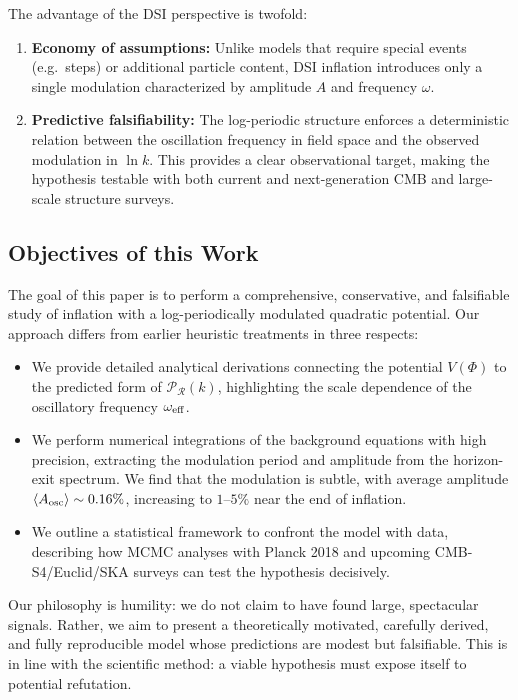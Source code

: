 \documentclass[reprint, amsmath, amssymb, aps, prd, nofootinbib]{revtex4-2}
\begin{document}
The advantage of the DSI perspective is twofold:
\begin{enumerate}
    \item \textbf{Economy of assumptions:} Unlike models that require special events
    (e.g.\ steps) or additional particle content, DSI inflation introduces only a single
    modulation characterized by amplitude $A$ and frequency $\omega$.
    \item \textbf{Predictive falsifiability:} The log-periodic structure enforces a
    deterministic relation between the oscillation frequency in field space and the
    observed modulation in $\ln k$. This provides a clear observational target, making
    the hypothesis testable with both current and next-generation CMB and large-scale
    structure surveys.
\end{enumerate}

\subsection{Objectives of this Work}

The goal of this paper is to perform a comprehensive, conservative, and falsifiable
study of inflation with a log-periodically modulated quadratic potential. Our approach
differs from earlier heuristic treatments in three respects:
\begin{itemize}
    \item We provide detailed analytical derivations connecting the potential
    $V(\Phi)$ to the predicted form of $\mathcal{P}_\mathcal{R}(k)$, highlighting the
    scale dependence of the oscillatory frequency $\omega_{\rm eff}$.
    \item We perform numerical integrations of the background equations with high
    precision, extracting the modulation period and amplitude from the horizon-exit
    spectrum. We find that the modulation is subtle, with average amplitude
    $\langle A_{\rm osc}\rangle \sim 0.16\%$, increasing to $1$--$5\%$ near the end of
    inflation.
    \item We outline a statistical framework to confront the model with data, describing
    how MCMC analyses with Planck 2018 and upcoming CMB-S4/Euclid/SKA surveys can test
    the hypothesis decisively.
\end{itemize}

Our philosophy is humility: we do not claim to have found large, spectacular signals.
Rather, we aim to present a theoretically motivated, carefully derived, and fully
reproducible model whose predictions are modest but falsifiable. This is in line with the
scientific method: a viable hypothesis must expose itself to potential refutation.
\end{document}
